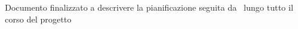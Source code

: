 Documento finalizzato a descrivere la pianificazione seguita da \gruppo\ lungo tutto il corso del progetto 